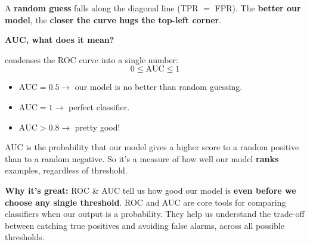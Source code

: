 \noindent
A \textbf{random guess} falls along the diagonal line (TPR $=$ FPR). The \textbf{better our model}, the \textbf{closer the curve hugs the top-left corner}.

\highspace
\begin{flushleft}
    \textcolor{Green3}{ \textbf{AUC, what does it mean?}}
\end{flushleft}
 condenses the ROC curve into a single number:
\begin{equation}
    0 \leq \text{AUC} \leq 1
\end{equation}
\begin{itemize}
    \item $\text{AUC} = 0.5 \rightarrow$ our model is no better than random guessing.
    \item $\text{AUC} = 1 \rightarrow$ perfect classifier.
    \item $\text{AUC} > 0.8 \rightarrow$ pretty good!
\end{itemize}
AUC is the probability that our model gives a higher score to a random positive than to a random negative. So it's a measure of how well our model \textbf{ranks} examples, regardless of threshold.

\highspace
\textcolor{Green3}{ \textbf{Why it's great:}} ROC \& AUC tell us how good our model is \textbf{even before we choose any single threshold}. ROC and AUC are core tools for comparing classifiers when our output is a probability. They help us understand the trade-off between catching true positives and avoiding false alarms, across all possible thresholds.

